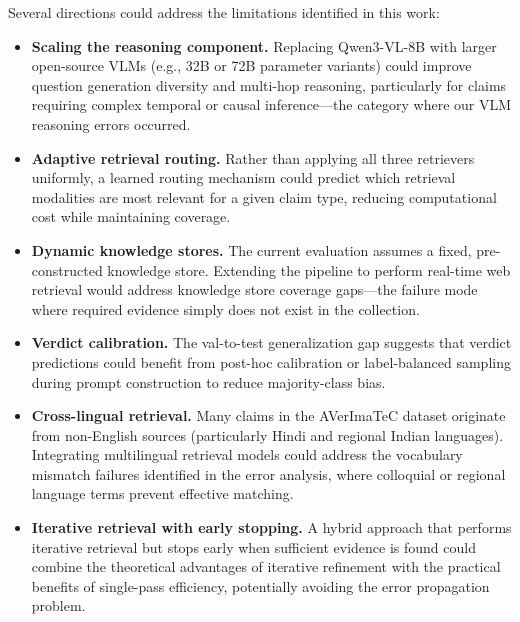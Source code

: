 Several directions could address the limitations identified in this work:

\begin{itemize}
    \item \textbf{Scaling the reasoning component.} Replacing Qwen3-VL-8B with larger open-source VLMs (e.g., 32B or 72B parameter variants) could improve question generation diversity and multi-hop reasoning, particularly for claims requiring complex temporal or causal inference---the category where our VLM reasoning errors occurred.
    
    \item \textbf{Adaptive retrieval routing.} Rather than applying all three retrievers uniformly, a learned routing mechanism could predict which retrieval modalities are most relevant for a given claim type, reducing computational cost while maintaining coverage.
    
    \item \textbf{Dynamic knowledge stores.} The current evaluation assumes a fixed, pre-constructed knowledge store. Extending the pipeline to perform real-time web retrieval would address knowledge store coverage gaps---the failure mode where required evidence simply does not exist in the collection.
    
    \item \textbf{Verdict calibration.} The val-to-test generalization gap suggests that verdict predictions could benefit from post-hoc calibration or label-balanced sampling during prompt construction to reduce majority-class bias.
    
    \item \textbf{Cross-lingual retrieval.} Many claims in the AVerImaTeC dataset originate from non-English sources (particularly Hindi and regional Indian languages). Integrating multilingual retrieval models could address the vocabulary mismatch failures identified in the error analysis, where colloquial or regional language terms prevent effective matching.
    
    \item \textbf{Iterative retrieval with early stopping.} A hybrid approach that performs iterative retrieval but stops early when sufficient evidence is found could combine the theoretical advantages of iterative refinement with the practical benefits of single-pass efficiency, potentially avoiding the error propagation problem.
\end{itemize}
